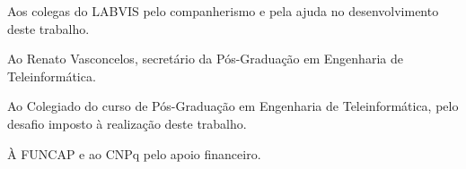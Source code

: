 Aos colegas do LABVIS pelo companherismo e pela ajuda no desenvolvimento deste trabalho.

Ao Renato Vasconcelos, secretário da Pós-Graduação em Engenharia de Teleinformática.

Ao Colegiado do curso de Pós-Graduação em Engenharia de Teleinformática, pelo desafio imposto à realização deste trabalho.

À FUNCAP e ao CNPq pelo apoio financeiro.
